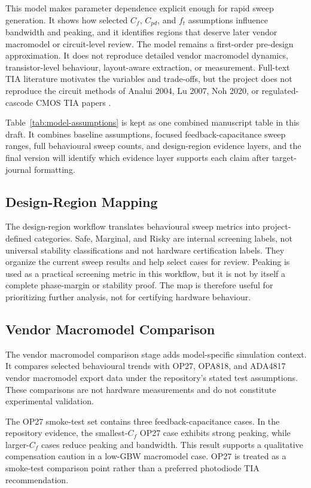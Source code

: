 This model makes parameter dependence explicit enough for rapid sweep generation. It shows how selected $C_f$, $C_{pd}$, and $f_t$ assumptions influence bandwidth and peaking, and it identifies regions that deserve later vendor macromodel or circuit-level review. The model remains a first-order pre-design approximation. It does not reproduce detailed vendor macromodel dynamics, transistor-level behaviour, layout-aware extraction, or measurement. Full-text TIA literature motivates the variables and trade-offs, but the project does not reproduce the circuit methods of Analui 2004, Lu 2007, Noh 2020, or regulated-cascode CMOS TIA papers \citep{ANALUI_2004_BW_ENHANCEMENT,LU_2007_BROADBAND_TIA,NOH_2020_CF_TIA_DC_LOOP,PARK_YOO_2004_RGC_TIA}.

Table~\ref{tab:model-assumptions} is kept as one combined manuscript table in this draft. It combines baseline assumptions, focused feedback-capacitance sweep ranges, full behavioural sweep counts, and design-region evidence layers, and the final version will identify which evidence layer supports each claim after target-journal formatting.

\subsection{Design-Region Mapping}

The design-region workflow translates behavioural sweep metrics into project-defined categories. Safe, Marginal, and Risky are internal screening labels, not universal stability classifications and not hardware certification labels. They organize the current sweep results and help select cases for review. Peaking is used as a practical screening metric in this workflow, but it is not by itself a complete phase-margin or stability proof. The map is therefore useful for prioritizing further analysis, not for certifying hardware behaviour.

\subsection{Vendor Macromodel Comparison}

The vendor macromodel comparison stage adds model-specific simulation context. It compares selected behavioural trends with OP27, OPA818, and ADA4817 vendor macromodel export data under the repository's stated test assumptions. These comparisons are not hardware measurements and do not constitute experimental validation.

The OP27 smoke-test set contains three feedback-capacitance cases. In the repository evidence, the smallest-$C_f$ OP27 case exhibits strong peaking, while larger-$C_f$ cases reduce peaking and bandwidth. This result supports a qualitative compensation caution in a low-GBW macromodel case. OP27 is treated as a smoke-test comparison point rather than a preferred photodiode TIA recommendation.

